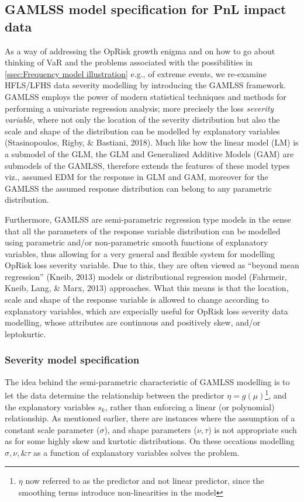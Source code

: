 \documentclass{DissertateUSU}
\begin{document}
\subsection{GAMLSS model specification for PnL impact data}
\label{ssec:GAMLSS Model specification for PnL impact data}

As a way of addressing the OpRisk growth enigma and on how to go about
thinking of VaR and the problems associated with the possibilities in
\ref{ssec:Frequency model illustration} e.g., of extreme events, we
re-examine HFLS/LFHS data severity modelling by introducing the GAMLSS
framework. GAMLSS employs the power of modern statistical techniques and
methods for performing a univariate regression analysis; more precisely
the loss \emph{severity variable}, where not only the location of the
severity distribution but also the scale and shape of the distribution
can be modelled by explanatory variables (Stasinopoulos, Rigby, \&
Bastiani, 2018). Much like how the linear model (LM) is a submodel of
the GLM, the GLM and Generalized Additive Models (GAM) are submodels of
the GAMLSS, therefore extends the features of these model types viz.,
assumed EDM for the response in GLM and GAM, moreover for the GAMLSS the
assumed response distribution can belong to any parametric
distribution.\medskip

Furthermore, GAMLSS are semi-parametric regression type models in the
sense that all the parameters of the response variable distribution can
be modelled using parametric and/or non-parametric smooth functions of
explanatory variables, thus allowing for a very general and flexible
system for modelling OpRisk loss severity variable. Due to this, they
are often viewed as ``beyond mean regression'' (Kneib, 2013) models or
distributional regression model (Fahrmeir, Kneib, Lang, \& Marx, 2013)
approaches. What this means is that the location, scale and shape of the
response variable is allowed to change according to explanatory
variables, which are expecially useful for OpRisk loss severity data
modelling, whose attributes are continuous and positively skew, and/or
leptokurtic.\medskip  

\subsubsection{Severity model specification}
\label{sssec:Severity model specification}

The idea behind the semi-parametric characteristic of GAMLSS modelling
is to let the data determine the relationship between the predictor
\(\eta = g(\mu)\)\footnote{$\eta$ now referred to as the predictor and not linear predictor, since the smoothing terms introduce non-linearities in the model},
and the explanatory variables \(s_k\), rather than enforcing a linear
(or polynomial) relationship. As mentioned earlier, there are instances
where the assumption of a constant scale parameter (\(\sigma\)), and
shape parameters (\(\nu, \tau\)) is not appropriate such as for some
highly skew and kurtotic distributions. On these occations modelling
\(\sigma, \nu, \& \tau\) as a function of explanatory variables solves
the problem.\medskip
\end{document}

